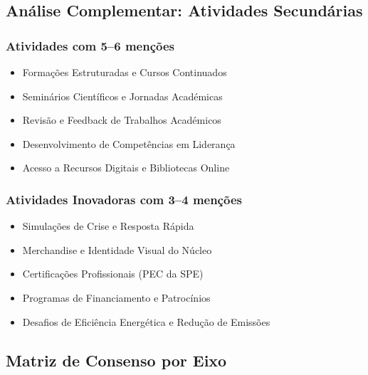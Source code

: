 \documentclass[12pt,a4paper]{article}
\begin{document}
\newpage

\subsection{Análise Complementar: Atividades Secundárias}

\subsubsection*{Atividades com 5–6 menções}
\begin{itemize}
    \item Formações Estruturadas e Cursos Continuados
    \item Seminários Científicos e Jornadas Académicas
    \item Revisão e Feedback de Trabalhos Académicos
    \item Desenvolvimento de Competências em Liderança
    \item Acesso a Recursos Digitais e Bibliotecas Online
\end{itemize}

\subsubsection*{Atividades Inovadoras com 3–4 menções}
\begin{itemize}
    \item Simulações de Crise e Resposta Rápida
    \item Merchandise e Identidade Visual do Núcleo
    \item Certificações Profissionais (PEC da SPE)
    \item Programas de Financiamento e Patrocínios
    \item Desafios de Eficiência Energética e Redução de Emissões
\end{itemize}

\newpage

\subsection{Matriz de Consenso por Eixo}
\end{document}
